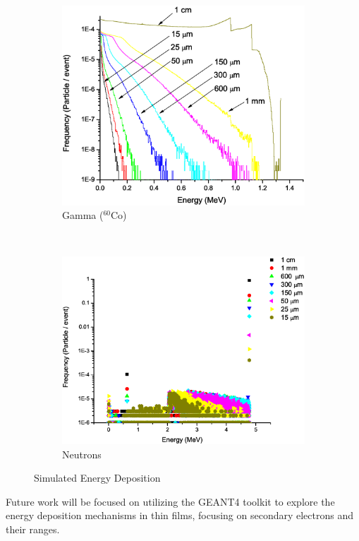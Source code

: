 \documentclass{anstrans}
\newcommand{\iso}[2]{${}^{#2}${#1}}
\newcommand{\figurewidth}{0.45\textwidth}
\begin{document}
\begin{figure}[h]
	\centering
	\begin{subfigure}[b]{\figurewidth}
    		\includegraphics[width=\textwidth]{PS_EDepSim_Co60}
		\caption{Gamma (\iso{Co}{60})}
	\end{subfigure}%
	~
	\begin{subfigure}[b]{\figurewidth}
    		\includegraphics[width=\textwidth]{PS_EDepSim_Neutron}
		\caption{Neutrons}
	\end{subfigure}%
	\caption{Simulated Energy Deposition}
	\label{fig:SimEDep}
\end{figure}
Future work will be focused on utilizing the GEANT4 toolkit to explore the energy deposition mechanisms in thin films, focusing on secondary electrons and their ranges. 
\end{document}
